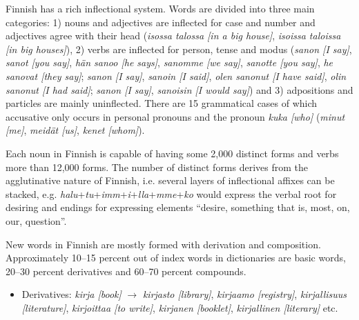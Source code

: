 \documentclass[]{../../metanetpaper}
\begin{document}
\begin{multicols}{2}
Finnish has a rich inflectional system. Words are divided into three main
categories: 1) nouns and adjectives are inflected for case and number and
adjectives agree with their head
(\textit{\foreignlanguage{finnish}{\textit{isossa talossa}} [in a big house]},
 \textit{\foreignlanguage{finnish}{\textit{isoissa taloissa}}
         [in big houses]}),
2) verbs are inflected for person, tense and modus
(\textit{\foreignlanguage{finnish}{\textit{sanon}} [I say]},
 \textit{\foreignlanguage{finnish}{\textit{sanot}} [you say]},
 \textit{\foreignlanguage{finnish}{\textit{hän sanoo}} [he says]},
 \textit{\foreignlanguage{finnish}{\textit{sanomme}} [we say]},
 \textit{\foreignlanguage{finnish}{\textit{sanotte}} [you say]},
 \textit{\foreignlanguage{finnish}{\textit{he sanovat}} [they say]};
 \textit{\foreignlanguage{finnish}{\textit{sanon}} [I say]},
 \textit{\foreignlanguage{finnish}{\textit{sanoin}} [I said]},
 \textit{\foreignlanguage{finnish}{\textit{olen sanonut}} [I have said]},
 \textit{\foreignlanguage{finnish}{\textit{olin sanonut}} [I had said]};
 \textit{\foreignlanguage{finnish}{\textit{sanon}} [I say]},
 \textit{\foreignlanguage{finnish}{\textit{sanoisin}} [I would say]})
 and 3) adpositions and particles are mainly uninflected. There are 15
grammatical cases of which accusative only occurs in personal pronouns and the
pronoun
\textit{\foreignlanguage{finnish}{\textit{kuka}} [who]} %
 (\textit{\foreignlanguage{finnish}{\textit{minut}} [me]},
  \textit{\foreignlanguage{finnish}{\textit{meidät}} [us]},
  \textit{\foreignlanguage{finnish}{\textit{kenet}} [whom]}).

Each noun in Finnish is capable of having some 2,000 distinct forms
and verbs more than 12,000 forms. The number of distinct forms derives
from the agglutinative nature of Finnish, i.e. several layers of
inflectional affixes can be stacked,
e.g. \textit{halu}+\textit{tu}+\textit{imm}+\textit{i}+\textit{lla}+\textit{mme}+\textit{ko}
would express the verbal root for desiring and endings for expressing
elements “desire, something that is, most, on, our, question”.

New words in Finnish are mostly formed with derivation and composition.
Approximately 10–15 percent out of index words in dictionaries are basic words,
20–30 percent derivatives and 60–70 percent compounds.
\begin{itemize}
\item Derivatives:
   \textit{\foreignlanguage{finnish}{\textit{kirja}} [book]} $\to$
   \textit{\foreignlanguage{finnish}{\textit{kirjasto}} [library]},
   \textit{\foreignlanguage{finnish}{\textit{kirjaamo}} [registry]},
   \textit{\foreignlanguage{finnish}{\textit{kirjallisuus}} [literature]},
   \textit{\foreignlanguage{finnish}{\textit{kirjoittaa}} [to write]},
   \textit{\foreignlanguage{finnish}{\textit{kirjanen}} [booklet]},
   \textit{\foreignlanguage{finnish}{\textit{kirjallinen}} [literary]} etc.


\end{itemize}
\end{multicols}
\end{document}
